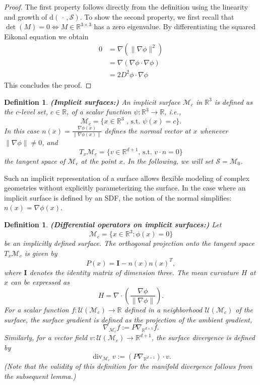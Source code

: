 \documentclass[12pt,openany]{book}
\newcommand{\R}{\mathbb{R}}
\def\S{\mathcal{S}}
\theoremstyle{plainnormal}
\newtheorem{definition}[theorem]{Definition}
\theoremstyle{remark}
\begin{document}
\begin{proof}
    The first property follows directly from the definition using the linearity and growth of $\mathrm{d}(\,\cdot\,, \S)$. To show the second property, we first recall that {$\det(M) = 0 \Leftrightarrow M\in\R^{3\times3}$} has a zero eigenvalue. By differentiating the squared Eikonal equation we obtain
    \begin{align*}
        0 &= \nabla(\|\nabla \phi\|^2)\\
        &= \nabla ( \nabla \phi \cdot \nabla\phi)\\
        &= 2 D^2 \phi \cdot \nabla\phi
    \end{align*} 
    This concludes the proof.
\end{proof}
\begin{definition}\textbf{(Implicit surfaces:)}
    An \emph{implicit surface} $\mathcal{M}_c$ in $\R^3$ is defined as the $c$-level set, $c\in \R$, of a scalar function $\psi: \R^3\rightarrow\R$, i.e.,
$$\mathcal M_c=\{x\in\R^3 \text{ , s.t. } \psi(x)=c\}.$$
    In this case $n(x) = \frac{\nabla \phi(x)}{\|\nabla \phi(x)\|}$ defines the normal vector at $x$ whenever $\|\nabla \phi\| \ne 0$, and $$T_x\mathcal{M}_c = \{v\in \R^{d+1} \text{, s.t. } v\cdot n = 0\}$$ the tangent space of $\mathcal{M}_c$ at the point $x$. In the following, we will set $\S = \mathcal{M}_0$.
\end{definition}
Such an implicit representation of a surface allows flexible modeling of complex geometries without explicitly parameterizing the surface. In the case where an implicit surface is defined by an SDF, the notion of the normal simplifies: $n(x) = {\nabla \phi(x)}$.  
\begin{definition}\label{def:diff_ops_implicit_surface}\textbf{(Differential operators on implicit surfaces:)} Let $$\mathcal{M}_c = \{ x \in \mathbb{R}^{3} : \phi(x) = 0 \}$$ be an implicitly defined surface. 
The \emph{orthogonal projection} onto the tangent space \(T_x \mathcal{M}_c\) is given by
\[
P(x) = \mathbf I - n(x) n(x)^T,
\]
where \(\mathbf I\) denotes the identity matrix of dimension three.
The \emph{mean curvature} \(H\) at \(x\) can be expressed as
\[
H =  \nabla \cdot \left( \frac{\nabla \phi}{\|\nabla \phi\|} \right).
\]
For a scalar function \(f : \mathcal{U}(\mathcal{M}_c) \to \mathbb{R}\) defined in a neighborhood \(\mathcal{U}(\mathcal{M}_c)\) of the surface, the \emph{surface gradient} is defined as the projection of the ambient gradient,
\[
\nabla_{\mathcal{M}_c} f := P \nabla_{\mathbb{R}^{d+1}} f.
\]
Similarly, for a vector field \(v : \mathcal{U}(\mathcal{M}_c) \to \mathbb{R}^{d+1}\), the \emph{surface divergence} is defined by
\[
\operatorname{div}_{\mathcal{M}_c} v :=  (P \nabla_{\mathbb{R}^{d+1}}) \cdot v.
\]
(Note that the validity of this definition for the manifold divergence follows from the subsequent lemma.)
\end{definition}
\end{document}

